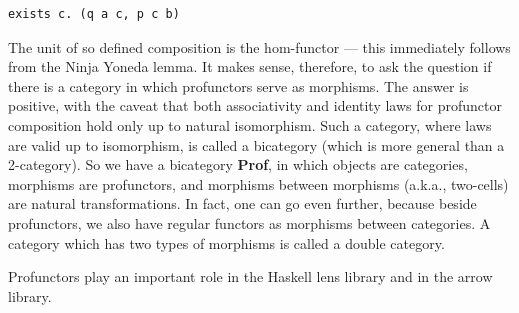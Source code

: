 \begin{verbatim}
exists c. (q a c, p c b)
\end{verbatim}
The unit of so defined composition is the hom-functor --- this
immediately follows from the Ninja Yoneda lemma. It makes sense,
therefore, to ask the question if there is a category in which
profunctors serve as morphisms. The answer is positive, with the caveat
that both associativity and identity laws for profunctor composition
hold only up to natural isomorphism. Such a category, where laws are
valid up to isomorphism, is called a bicategory (which is more general
than a 2-category). So we have a bicategory \textbf{Prof}, in which
objects are categories, morphisms are profunctors, and morphisms between
morphisms (a.k.a., two-cells) are natural transformations. In fact, one
can go even further, because beside profunctors, we also have regular
functors as morphisms between categories. A category which has two types
of morphisms is called a double category.

Profunctors play an important role in the Haskell lens library and in
the arrow library.